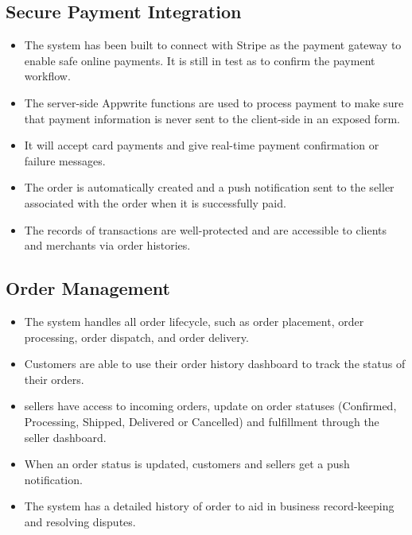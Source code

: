 \subsection{Secure Payment Integration}
\begin{itemize}
    \item The system has been built to connect with Stripe as the payment gateway to enable safe online payments. It is still in test as to confirm the payment workflow.
    
    \item The server-side Appwrite functions are used to process payment to make sure that payment information is never sent to the client-side in an exposed form.
    
    \item It will accept card payments and give real-time payment confirmation or failure messages.
    
    \item The order is automatically created and a push notification sent to the seller associated with the order when it is successfully paid.
    
    \item The records of transactions are well-protected and are accessible to clients and merchants via order histories.
\end{itemize}

\subsection{Order Management}
\begin{itemize}
    \item The system handles all order lifecycle, such as order placement, order processing, order dispatch, and order delivery.
    
    \item Customers are able to use their order history dashboard to track the status of their orders.
    
    \item sellers have access to incoming orders, update on order statuses (Confirmed, Processing, Shipped, Delivered or Cancelled) and fulfillment through the seller dashboard.
    
    \item When an order status is updated, customers and sellers get a push notification.
    
    \item The system has a detailed history of order to aid in business record-keeping and resolving disputes.
\end{itemize}

